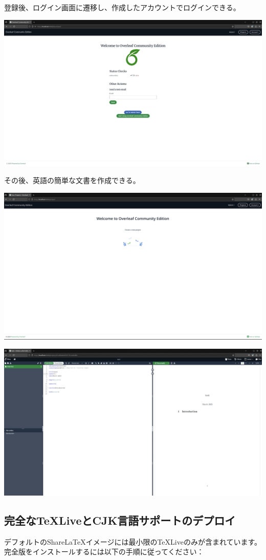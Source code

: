 登録後、ログイン画面に遷移し、作成したアカウントでログインできる。

\includegraphics[width=0.8\linewidth]{images/Pasted image 20250307160656.png}

その後、英語の簡単な文書を作成できる。

\includegraphics[width=0.8\linewidth]{images/Pasted image 20250307160922.png}

\includegraphics[width=0.8\linewidth]{images/Pasted image 20250307161002.png}

\subsection{完全なTeXLiveとCJK言語サポートのデプロイ}
デフォルトのShareLaTeXイメージには最小限のTeXLiveのみが含まれています。完全版をインストールするには以下の手順に従ってください：


